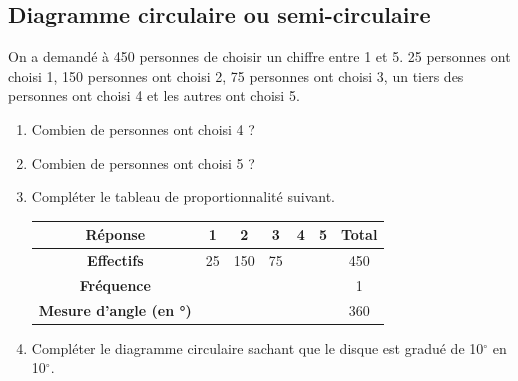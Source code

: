 \documentclass[a4paper]{book}
\begin{document}
\subsection{Diagramme circulaire ou semi-circulaire}

    \begin{exemple}
        On a demandé à 450 personnes de choisir un chiffre entre 1 et 5. 25 personnes ont choisi 1, 150 personnes ont choisi 2, 75 personnes ont choisi 3, un tiers des personnes ont choisi 4 et les autres ont choisi 5.

        \begin{enumerate}
            \item Combien de personnes ont choisi 4 ?

            \item Combien de personnes ont choisi 5 ?
        
            \item Compléter le tableau de proportionnalité suivant.
        
            \begin{center}
                \begin{tabular}{c|c|c|c|c|c|c}
                    \toprule
                    \textbf{Réponse} & \textbf{1} & \textbf{2} & \textbf{3} & \textbf{4} & \textbf{5} & \textbf{Total} \\
                    \midrule
                    \textbf{Effectifs} & 25 & 150 & 75 & \phantom{150} & \phantom{150} & 450 \\\hline
                    \textbf{Fréquence} &  &  & & \phantom{150} & \phantom{150} & 1 \\\hline
                    \textbf{Mesure d'angle (en °)} & \phantom{72} & \phantom{72} & \phantom{72} & \phantom{72} & \phantom{72} & 360 \\
                    \bottomrule
                \end{tabular}
            \end{center}

            \item Compléter le diagramme circulaire sachant que le disque est gradué de 10$^\circ$ en 10$^\circ$.
            
            \begin{center}
            \end{center}
        \end{enumerate}
    \end{exemple}
\end{document}
